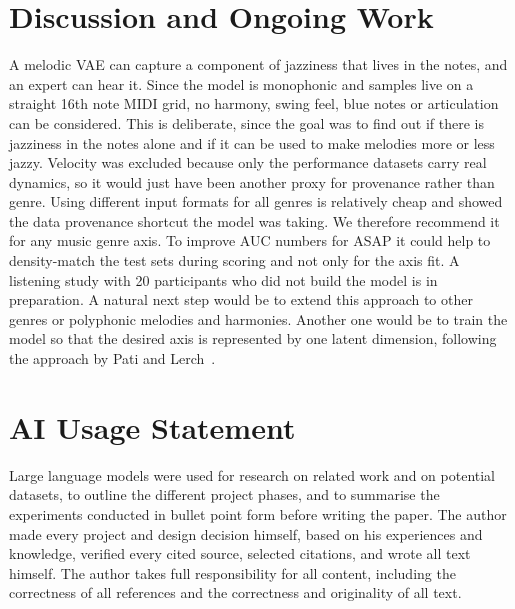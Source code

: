 \documentclass{article}
\begin{document}
\section{Discussion and Ongoing Work}\label{sec:discussion}

A melodic VAE can capture a component of jazziness that lives in the notes,
and an expert can hear it. Since the model is monophonic and samples live on a
straight 16th note MIDI grid, no harmony, swing feel, blue notes or articulation
can be considered. This is deliberate, since the goal was to find out if there is
jazziness in the notes alone and if it can be used to make melodies more or less
jazzy. Velocity was excluded because only
the performance datasets carry real dynamics, so it would just have been another proxy
for provenance rather than genre.
Using different input formats for all genres is relatively cheap and 
showed the data provenance shortcut the model was taking. We therefore recommend it for any
music genre axis. To improve AUC numbers for ASAP it could help to density-match 
the test sets during scoring and not only for the axis fit. 
A listening study with 20 participants
who did not build the model is in preparation.
A natural next step would be to extend this approach to other genres or polyphonic melodies and harmonies.
Another one would be to train the model so that the desired axis is represented by one latent dimension,
following the approach by Pati and Lerch~\cite{pati2021attribute}.

\section{AI Usage Statement}\label{sec:ai}

Large language models were used for research on related work and on potential datasets, to
outline the different project phases, and to summarise the experiments conducted in bullet point form
before writing the paper.
The author made every project and design decision himself, based on his experiences and knowledge,
verified every cited source, selected citations, and wrote all
text himself. The author takes full responsibility for all content, including the
correctness of all references and the correctness and originality of all text.


\end{document}
